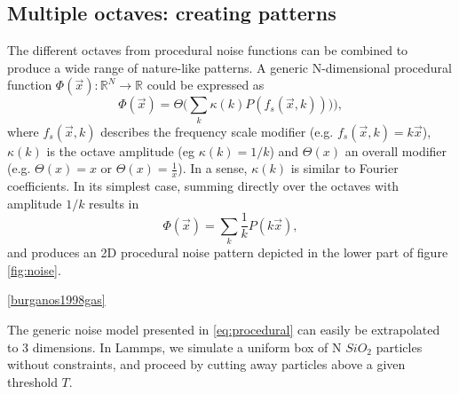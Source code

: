 \documentclass[aps,pre,twocolumn,letterpaper,floatfix,showpacs]{revtex4}
\begin{document}
\subsection{Multiple octaves: creating patterns}
\label{sec:octaves}
The different octaves from procedural noise functions can be combined
to produce a wide range of nature-like patterns. A generic
N-dimensional procedural function $\Phi(\vec x): \mathbb R^N \to
\mathbb R$ could be expressed as
\begin{equation}
\label{eq:procedural}
 \Phi(\vec x) = \Theta \Big(\sum_k \kappa (k) P(  f_s (\vec x,k) )) \Big),
 \end{equation}
where $f_s(\vec x,k)$ describes the frequency scale modifier (e.g. $f_s(\vec x,k) =
k\vec x$), $\kappa(k)$ is the octave amplitude (eg $\kappa(k) = 1/k$)
and $\Theta(x)$ an overall modifier (e.g. $\Theta(x) = x$ or
$\Theta(x) = \frac{1}{x}$). In a sense, $\kappa(k)$ is similar to Fourier coefficients. 
In its simplest case, summing directly
over the octaves with amplitude $1/k$ results in 
\begin{equation}
\label{eq:perlinlinear}
 \Phi(\vec x) = \sum_k \frac{1}{k} P( k\vec x), 
\end{equation}
and produces an 2D procedural noise pattern depicted in the lower
part of figure \ref{fig:noise}. 




\ref{burganos1998gas}

The generic noise model presented in \ref{eq:procedural} can easily be extrapolated to 3 dimensions. In Lammps, we
simulate a uniform box of N $SiO_2$ particles without constraints, and proceed by cutting away particles above a given threshold $T$.
%


\end{document}
